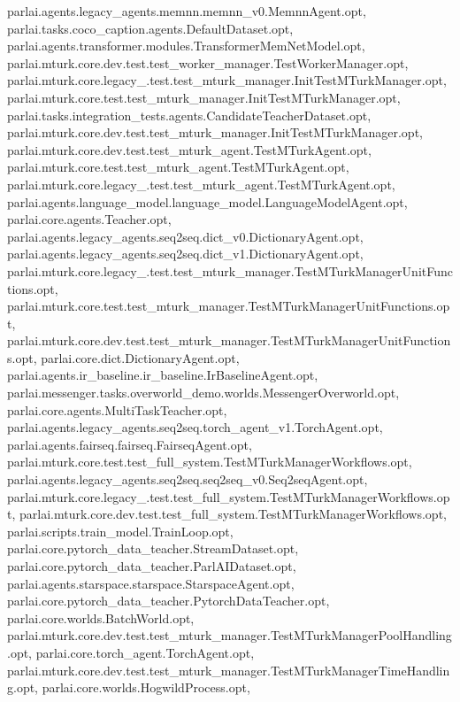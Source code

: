 parlai.\+agents.\+legacy\+\_\+agents.\+memnn.\+memnn\+\_\+v0.\+Memnn\+Agent.\+opt, parlai.\+tasks.\+coco\+\_\+caption.\+agents.\+Default\+Dataset.\+opt, parlai.\+agents.\+transformer.\+modules.\+Transformer\+Mem\+Net\+Model.\+opt, parlai.\+mturk.\+core.\+dev.\+test.\+test\+\_\+worker\+\_\+manager.\+Test\+Worker\+Manager.\+opt, parlai.\+mturk.\+core.\+legacy\+\_.\+test.\+test\+\_\+mturk\+\_\+manager.\+Init\+Test\+M\+Turk\+Manager.\+opt, parlai.\+mturk.\+core.\+test.\+test\+\_\+mturk\+\_\+manager.\+Init\+Test\+M\+Turk\+Manager.\+opt, parlai.\+tasks.\+integration\+\_\+tests.\+agents.\+Candidate\+Teacher\+Dataset.\+opt, parlai.\+mturk.\+core.\+dev.\+test.\+test\+\_\+mturk\+\_\+manager.\+Init\+Test\+M\+Turk\+Manager.\+opt, parlai.\+mturk.\+core.\+dev.\+test.\+test\+\_\+mturk\+\_\+agent.\+Test\+M\+Turk\+Agent.\+opt, parlai.\+mturk.\+core.\+test.\+test\+\_\+mturk\+\_\+agent.\+Test\+M\+Turk\+Agent.\+opt, parlai.\+mturk.\+core.\+legacy\+\_.\+test.\+test\+\_\+mturk\+\_\+agent.\+Test\+M\+Turk\+Agent.\+opt, parlai.\+agents.\+language\+\_\+model.\+language\+\_\+model.\+Language\+Model\+Agent.\+opt, parlai.\+core.\+agents.\+Teacher.\+opt, parlai.\+agents.\+legacy\+\_\+agents.\+seq2seq.\+dict\+\_\+v0.\+Dictionary\+Agent.\+opt, parlai.\+agents.\+legacy\+\_\+agents.\+seq2seq.\+dict\+\_\+v1.\+Dictionary\+Agent.\+opt, parlai.\+mturk.\+core.\+legacy\+\_.\+test.\+test\+\_\+mturk\+\_\+manager.\+Test\+M\+Turk\+Manager\+Unit\+Functions.\+opt, parlai.\+mturk.\+core.\+test.\+test\+\_\+mturk\+\_\+manager.\+Test\+M\+Turk\+Manager\+Unit\+Functions.\+opt, parlai.\+mturk.\+core.\+dev.\+test.\+test\+\_\+mturk\+\_\+manager.\+Test\+M\+Turk\+Manager\+Unit\+Functions.\+opt, parlai.\+core.\+dict.\+Dictionary\+Agent.\+opt, parlai.\+agents.\+ir\+\_\+baseline.\+ir\+\_\+baseline.\+Ir\+Baseline\+Agent.\+opt, parlai.\+messenger.\+tasks.\+overworld\+\_\+demo.\+worlds.\+Messenger\+Overworld.\+opt, parlai.\+core.\+agents.\+Multi\+Task\+Teacher.\+opt, parlai.\+agents.\+legacy\+\_\+agents.\+seq2seq.\+torch\+\_\+agent\+\_\+v1.\+Torch\+Agent.\+opt, parlai.\+agents.\+fairseq.\+fairseq.\+Fairseq\+Agent.\+opt, parlai.\+mturk.\+core.\+test.\+test\+\_\+full\+\_\+system.\+Test\+M\+Turk\+Manager\+Workflows.\+opt, parlai.\+agents.\+legacy\+\_\+agents.\+seq2seq.\+seq2seq\+\_\+v0.\+Seq2seq\+Agent.\+opt, parlai.\+mturk.\+core.\+legacy\+\_.\+test.\+test\+\_\+full\+\_\+system.\+Test\+M\+Turk\+Manager\+Workflows.\+opt, parlai.\+mturk.\+core.\+dev.\+test.\+test\+\_\+full\+\_\+system.\+Test\+M\+Turk\+Manager\+Workflows.\+opt, parlai.\+scripts.\+train\+\_\+model.\+Train\+Loop.\+opt, parlai.\+core.\+pytorch\+\_\+data\+\_\+teacher.\+Stream\+Dataset.\+opt, parlai.\+core.\+pytorch\+\_\+data\+\_\+teacher.\+Parl\+A\+I\+Dataset.\+opt, parlai.\+agents.\+starspace.\+starspace.\+Starspace\+Agent.\+opt, parlai.\+core.\+pytorch\+\_\+data\+\_\+teacher.\+Pytorch\+Data\+Teacher.\+opt, parlai.\+core.\+worlds.\+Batch\+World.\+opt, parlai.\+mturk.\+core.\+dev.\+test.\+test\+\_\+mturk\+\_\+manager.\+Test\+M\+Turk\+Manager\+Pool\+Handling.\+opt, parlai.\+core.\+torch\+\_\+agent.\+Torch\+Agent.\+opt, parlai.\+mturk.\+core.\+dev.\+test.\+test\+\_\+mturk\+\_\+manager.\+Test\+M\+Turk\+Manager\+Time\+Handling.\+opt, parlai.\+core.\+worlds.\+Hogwild\+Process.\+opt, 